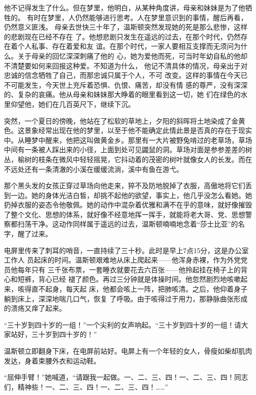 他不记得发生了什么。但在梦里，他明白，从某种角度讲，母亲和妹妹是为了他牺牲的。
有时在梦里，人仍然能够进行思考。人在梦里意识到的事情，醒后再看，仍然意义匪浅。
母亲去世快三十年了，温斯顿突然发现她的死是那么悲惨，这样的悲剧现在已经不存在
了。他想悲剧只发生在遥远的过去，在那个时代，仍然存在着个人私事、存在着爱和友
谊。在那个时代，一家人要相互支撑而无须问为什么。关于母亲的回忆深深刺痛了他的
心，她为爱他而死，可当时年幼自私的他却不清楚要如何来回报这种爱。不知道为什么，
他记不清具体的情况，母亲出于对忠诚的信念牺牲了自己，而那忠诚只属于个人，不可
改变。这样的事情在今天已不可能发生，今天世上充斥着恐惧、仇恨、痛苦，却没有情
感的尊严，没有深深的、复杂的哀痛。他从母亲和妹妹那大睁着的眼里看到这一切，她
们在绿色的水里仰望他，她们在几百英尺下，继续下沉。

突然，一个夏日的傍晚，他站在了松软的草地上，夕阳的斜晖将土地染成了金黄色。这景象经常出现在他的梦里，以至于他不能确定此情此景是否真的存在于现实中。从睡梦中醒来，他把这叫做黄金乡。那里有一大片被野兔啃过的老草场，草场中间有一条被人踩出来的小径，上面到处可见鼹鼠的洞。草场对面是参参差差的树丛，榆树的枝条在微风中轻轻摇晃，它抖动着的茂密的树叶就像女人的长发。而在不远处还有一条清澈的小溪在缓缓流淌，溪中有鱼在游弋。

那个黑头发的女孩正穿过草场向他走来，猝不及防地脱掉了衣服，高傲地将它们丢到一边。她的身体光洁白皙，却挑不起他的欲望，事实上，他几乎没怎么看她。她扔掉衣服的姿态令他敬佩。她的动作中混杂着优雅和满不在乎的意味，就好像摧毁了整个文化、思想的体系，就好像不经意地挥一挥手，就能将老大哥、党、思想警察都扫荡干净。这动作同样属于遥远的过去，温斯顿喃喃地念着``莎士比亚''的名字，醒了过来。

电屏里传来了刺耳的哨音，一直持续了三十秒。此时是早上7点15分，这是办公室工作人
员起床的时间。温斯顿艰难地从床上爬起来——他浑身赤裸，作为外党党员他每年只有
三千张布票，一套睡衣就要花去六百张——他拎起挂在椅子上的背心和短裤，背心已经
褪了颜色。再过三分钟就是体操时间。他忽然剧烈地咳嗽起来，咳得直不起身，每天起
床，他都会咳上一阵，把肺咳清。之后，他仰着身子躺到床上，深深地喘几口气，恢复
了呼吸。由于咳得过于用力，那静脉曲张形成的溃疡又痒了起来。

``三十岁到四十岁的一组！''一个尖利的女声响起。``三十岁到四十岁的一组！请大家站好，三十岁到四十岁的！''

温斯顿立即翻身下床，在电屏前站好。电屏上有一个年轻的女人，骨瘦如柴却肌肉发达，身着束腰外衣和运动鞋。

``屈伸手臂！''她喊道，``请跟我一起做。一、二、三、四！一、二、三、四！同志们，精神些！一、二、三、四！一、二、三、四！\ldots\ldots''

